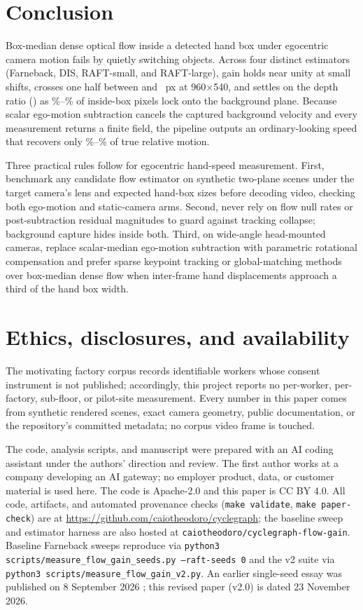 \documentclass[11pt]{article}
\begin{document}
\section{Conclusion}
\label{sec:conclusion}

Box-median dense optical flow inside a detected hand box under egocentric camera motion fails by
quietly switching objects. Across four distinct estimators (Farneback, DIS, RAFT-small, and
RAFT-large), gain holds near unity at small shifts, crosses one half between \cgHalfFineMean{} and
\cgHalfDisMean{}~px at 960$\times$540, and settles on the depth ratio (\cgRatio{}) as
\cgFieldCloserBgMin{}\%--\cgFieldCloserBgMax{}\% of inside-box pixels lock onto the background
plane. Because scalar ego-motion subtraction cancels the captured background velocity and every
measurement returns a finite field, the pipeline outputs an ordinary-looking speed that recovers
only \cgFieldRecMinPct{}\%--\cgFieldRecMaxPct{}\% of true relative motion.

Three practical rules follow for egocentric hand-speed measurement. First, benchmark any candidate
flow estimator on synthetic two-plane scenes under the target camera's lens and expected hand-box
sizes before decoding video, checking both ego-motion and static-camera arms. Second, never rely
on flow null rates or post-subtraction residual magnitudes to guard against tracking collapse;
background capture hides inside both. Third, on wide-angle head-mounted cameras, replace
scalar-median ego-motion subtraction with parametric rotational compensation and prefer sparse
keypoint tracking or global-matching methods over box-median dense flow when inter-frame hand
displacements approach a third of the hand box width.

\section*{Ethics, disclosures, and availability}

The motivating factory corpus records identifiable workers whose consent instrument is not
published; accordingly, this project reports no per-worker, per-factory, sub-floor, or pilot-site
measurement. Every number in this paper comes from synthetic rendered scenes, exact camera
geometry, public documentation, or the repository's committed metadata; no corpus video frame is
touched.

The code, analysis scripts, and manuscript were prepared with an AI coding assistant under the
authors' direction and review. The first author works at a company developing an AI gateway; no employer
product, data, or customer material is used here. The code is Apache-2.0 and this paper is CC BY 4.0. All code, artifacts, and automated provenance checks (\texttt{make validate},
\texttt{make paper-check}) are at \url{https://github.com/caiotheodoro/cyclegraph}; the baseline
sweep and estimator harness are also hosted at
\texttt{caiotheodoro/cyclegraph-flow-gain}. Baseline Farneback sweeps reproduce via
\texttt{python3 scripts/measure\_flow\_gain\_seeds.py --raft-seeds 0} and the v2 suite via
\texttt{python3 scripts/measure\_flow\_gain\_v2.py}. An earlier single-seed essay was published on
8 September 2026 \citep{theodoro2026essay}; this revised paper (v2.0) is dated 23 November 2026.
\end{document}
